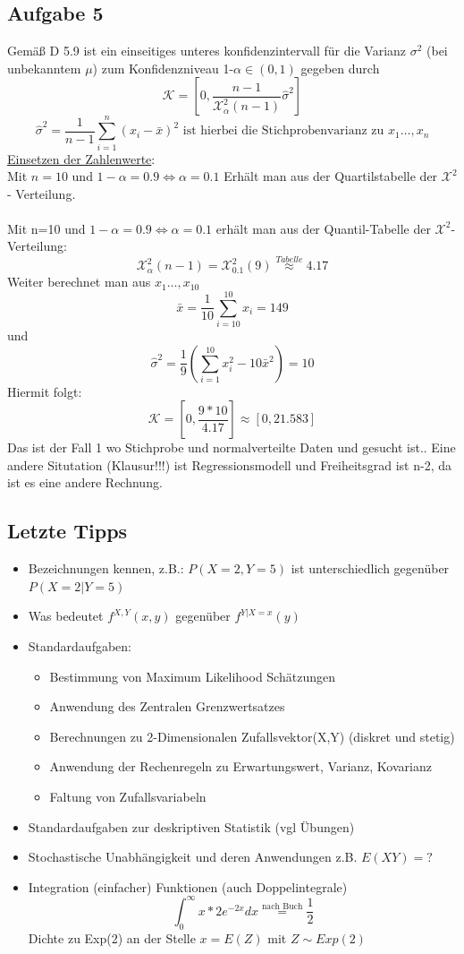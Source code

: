 \documentclass[10pt,a4paper]{article}
\begin{document}
\subsection{Aufgabe 5}
Gemäß D 5.9 ist ein einseitiges unteres konfidenzintervall für die Varianz $\sigma^2$ (bei unbekanntem $\mu$) zum Konfidenzniveau 1-$\alpha \in (0,1)$ gegeben durch 
$$\mathcal{K}= \left[0,\frac{n-1}{\mathcal{X}^2_{\alpha}(n-1)} \hat{\sigma}^2 \right]$$
$$\hat{\sigma}^2 = \frac{1}{n-1} \sum_{i=1}^{n} (x_i - \bar{x})^2 \text{ ist hierbei die Stichprobenvarianz zu } x_1\dots,x_n$$
\underline{Einsetzen der Zahlenwerte}:\\
Mit $n=10$ und $1-\alpha = 0.9 \Leftrightarrow \alpha = 0.1$ Erhält man aus der Quartilstabelle der $\mathcal{X}^2$ - Verteilung.\\~\\
Mit n=10 und $1-\alpha = 0.9 \Leftrightarrow \alpha = 0.1$ erhält man aus der Quantil-Tabelle der $\mathcal{X}^2$-Verteilung:
$$\mathcal{X}^2_{\alpha}(n-1) = \mathcal{X}^2_{0.1}(9) \overset{Tabelle}{\approx} 4.17$$
Weiter berechnet man aus $x_1\dots, x_{10}$
$$\bar{x} = \frac{1}{10} \sum_{i=10}^{10} x_i = 149$$ und
$$\hat{\sigma}^2 = \frac{1}{9} (\sum_{i=1}^{10} x^2_i - 10 \bar{x}^2) = 10$$
Hiermit folgt: 
$$\mathcal{K}= [0,\frac{9*10}{4.17}] \approx [0,21.583]$$
Das ist der Fall 1 wo Stichprobe und normalverteilte Daten und gesucht ist.. Eine andere Situtation (Klausur!!!) ist Regressionsmodell und Freiheitsgrad ist n-2, da ist es eine andere Rechnung.

\subsection{Letzte Tipps}
\begin{itemize}
	\item Bezeichnungen kennen, z.B.: $P(X=2,Y=5)$ ist unterschiedlich gegenüber $P(X=2|Y=5)$
	\item Was bedeutet $f^{X,Y}(x,y)$ gegenüber $f^{Y|X=x}(y)$
	\item Standardaufgaben:
	\begin{itemize}
		\item Bestimmung von Maximum Likelihood Schätzungen
		\item Anwendung des Zentralen Grenzwertsatzes
		\item Berechnungen zu 2-Dimensionalen Zufallsvektor(X,Y) (diskret und stetig)
		\item Anwendung der Rechenregeln zu Erwartungswert, Varianz, Kovarianz
		\item Faltung von Zufallsvariabeln
	\end{itemize}
	\item Standardaufgaben zur deskriptiven Statistik (vgl Übungen)
	\item Stochastische Unabhängigkeit und deren Anwendungen z.B. $E(XY) = ?$
	\item Integration (einfacher) Funktionen (auch Doppelintegrale)
	$$\int_{0}^{\infty} x*2e^{-2x} dx \overset{\text{nach Buch}}{=} \frac{1}{2} $$
	Dichte zu Exp(2) an der Stelle $x = E(Z)$ mit $Z \sim Exp(2)$
	\end{itemize} 
\end{document}
